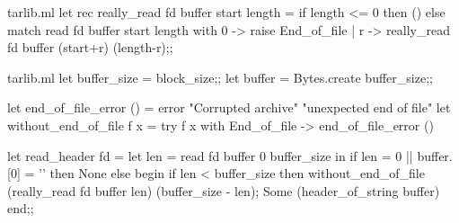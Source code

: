 %
\begin{codefile}{tarlib.ml}
let rec really_read fd buffer start length =
  if length <= 0 then () else
    match read fd buffer start length with
      0 -> raise End_of_file
    | r -> really_read fd buffer (start+r) (length-r);;
\end{codefile}
%
\begin{listingcodefile}{tarlib.ml}
let buffer_size = block_size;;
let buffer = Bytes.create buffer_size;;

let end_of_file_error () =
  error "Corrupted archive" "unexpected end of file"
let without_end_of_file f x =
  try f x with End_of_file -> end_of_file_error ()

let read_header fd =
  let len = read fd buffer 0 buffer_size in
  if len = 0 ||  buffer.[0] = '' then None
  else begin
    if len < buffer_size then
      without_end_of_file (really_read fd buffer len) (buffer_size - len);
    Some (header_of_string buffer)
  end;;
\end{listingcodefile}

